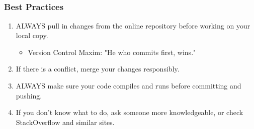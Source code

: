 \documentclass[]{beamer}
\begin{document}
\subsection{}
\begin{frame}[t]\frametitle{Best Practices}
  \begin{block}{}
    \begin{enumerate}
      \item ALWAYS pull in changes from the online repository before working on your local copy. 
        \begin{itemize}
          \item Version Control Maxim: "He who commits first, wins."
        \end{itemize}
      \item If there is a conflict, merge your changes responsibly.
      \item ALWAYS make sure your code compiles and runs before committing and pushing.
      \item If you don't know what to do, ask someone more knowledgeable, or check StackOverflow and similar sites.
    \end{enumerate}
  \end{block}
\end{frame}
\end{document}
